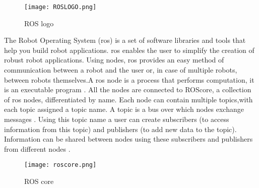 \begin{figure}[ht]
    \centering
    \texttt{[image: ROSLOGO.png]}
    \caption[ROS logo]{ROS logo}
\end{figure}

The Robot Operating System (\acs{ros}) is a set of software libraries and tools that help you build robot applications.
\acs{ros} enables the user to simplify the creation of robust robot applications. Using nodes, \acs{ros} provides an easy method of 
communication between a robot and the user or, in case of multiple robots, between robots themselves.A \acs{ros} node is a process 
that performs computation, it is an executable program \cite{ros:node}. All the nodes are 
connected to ROScore, a collection of \acs{ros} nodes, differentiated by name. Each node can contain multiple topics,with each topic 
assigned a topic name. A topic is a bus over which nodes exchange messages \cite{ros:topic}.
Using this topic name a user can create subscribers (to access information from this topic) and publishers (to add new data to the topic). 
Information can be shared between nodes using these subscribers and publishers from different nodes \cite{ros:about}.

\begin{figure}[ht]
    \centering
    \texttt{[image: roscore.png]}
    \caption[ROS core]{ROS core}
\end{figure}
